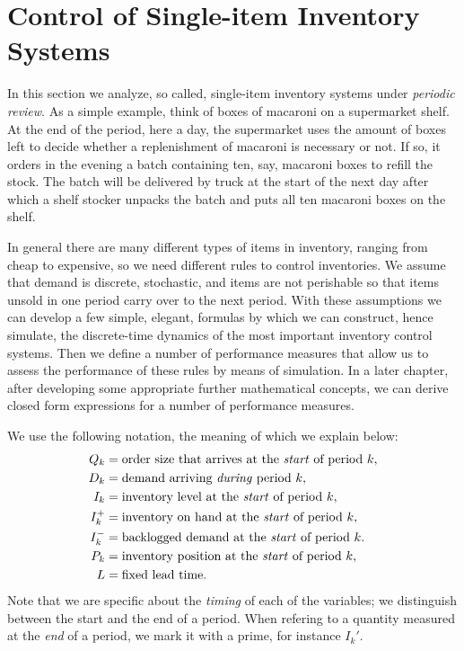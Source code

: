 \documentclass[stochastic-or.tex]{subfiles}
\begin{document}
\section{Control of Single-item Inventory Systems}
\label{sec:single-item-invent}

In this section we analyze, so called, single-item inventory systems under \emph{periodic review}.
As a simple example, think of boxes of macaroni on a supermarket shelf.
At the end of the period, here a day, the supermarket uses the amount of boxes left to decide whether a replenishment of macaroni is necessary or not.
If so, it orders in the evening a batch containing ten, say, macaroni boxes to refill the stock.
The batch will be delivered by truck at the start of the next day after which a shelf stocker unpacks the batch and puts all ten macaroni boxes on the shelf.

In general there are many different types of items in inventory, ranging from cheap to expensive, so we need different rules to control inventories.
We assume that demand is discrete, stochastic, and items are not perishable so that items unsold in one period carry over to the next period.
With these assumptions we can develop a few simple, elegant, formulas by which we can construct, hence simulate, the discrete-time dynamics of the most important inventory control systems.
Then we define a number of performance measures that allow us to assess the performance of these rules by means of simulation.
In a later chapter, after developing some appropriate further mathematical concepts, we can derive closed form expressions for a number of performance measures.


We use the following notation, the meaning of which we explain below:
\begin{align*}
  Q_k &= \text{order size that arrives at  the \emph{start} of period~$k$}, \\
  D_k &= \text{demand arriving \emph{during} period~$k$}, \\
  I_k &= \text{inventory level at the \emph{start} of period~$k$}, \\
I_k^+ &= \text{inventory on hand at the \emph{start} of period~$k$}, \\
I_k^- &= \text{backlogged demand at the \emph{start} of period~$k$}. \\
  P_k &= \text{inventory position at the \emph{start} of period~$k$}, \\
  L &= \text{fixed lead time.}
\end{align*}
Note  that we are specific about the \emph{timing} of each of the  variables; we distinguish between the start and the end of a period. When refering to a quantity measured at the \emph{end} of a period, we mark it with a prime, for instance $I_k'$.
\end{document}
